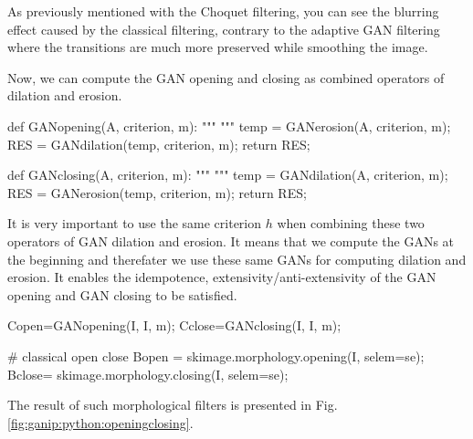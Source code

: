 \noindent As previously mentioned with the Choquet filtering, you can see the blurring effect caused by the classical filtering, contrary to the adaptive GAN filtering where the transitions are much more preserved while smoothing the image.

Now, we can compute the GAN opening and closing as combined operators of dilation and erosion.

\begin{python}
def GANopening(A, criterion, m):
    """   
    """
    temp = GANerosion(A, criterion, m);
    RES  = GANdilation(temp, criterion, m);
    return RES;
\end{python}

\begin{python}
def GANclosing(A, criterion, m):
    """    
    """
    temp = GANdilation(A, criterion, m);
    RES  = GANerosion(temp, criterion, m);
    return RES;
\end{python}

It is very important to use the same criterion $h$ when combining these two operators of GAN dilation and erosion. It means that we compute the GANs at the beginning and therefater we use these same GANs for computing dilation and erosion. It enables the idempotence, extensivity/anti-extensivity of the GAN opening and GAN closing to be satisfied.

\begin{python}
Copen=GANopening(I, I, m);
Cclose=GANclosing(I, I, m);

# classical open close
Bopen = skimage.morphology.opening(I, selem=se);
Bclose= skimage.morphology.closing(I, selem=se);
\end{python}

\noindent The result of such morphological filters is presented in Fig.\ref{fig:ganip:python:openingclosing}.

